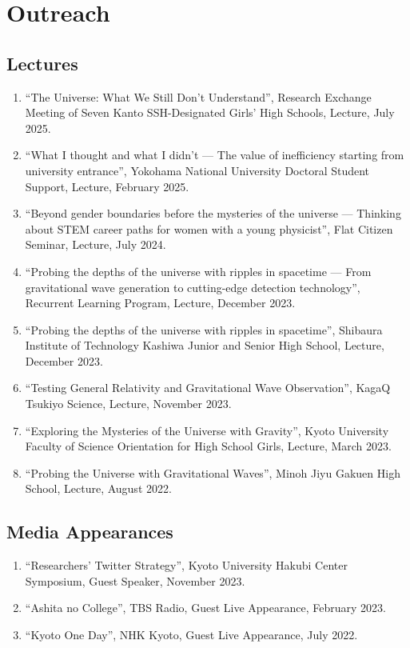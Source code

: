 \documentclass[uplatex, 12pt]{article}
\begin{document}

\section*{Outreach}
\subsection*{Lectures}
\begin{enumerate}
\item “The Universe: What We Still Don't Understand”, Research Exchange Meeting of Seven Kanto SSH-Designated Girls' High Schools, Lecture, July 2025.
\item “What I thought and what I didn’t — The value of inefficiency starting from university entrance”, Yokohama National University Doctoral Student Support, Lecture, February 2025.
\item “Beyond gender boundaries before the mysteries of the universe — Thinking about STEM career paths for women with a young physicist”, Flat Citizen Seminar, Lecture, July 2024.
\item “Probing the depths of the universe with ripples in spacetime — From gravitational wave generation to cutting-edge detection technology”, Recurrent Learning Program, Lecture, December 2023.
\item “Probing the depths of the universe with ripples in spacetime”, Shibaura Institute of Technology Kashiwa Junior and Senior High School, Lecture, December 2023.
\item “Testing General Relativity and Gravitational Wave Observation”, KagaQ Tsukiyo Science, Lecture, November 2023.
\item “Exploring the Mysteries of the Universe with Gravity”, Kyoto University Faculty of Science Orientation for High School Girls, Lecture, March 2023.
\item “Probing the Universe with Gravitational Waves”, Minoh Jiyu Gakuen High School, Lecture, August 2022.
\end{enumerate}
\subsection*{Media Appearances}
\begin{enumerate}
\item “Researchers’ Twitter Strategy”, Kyoto University Hakubi Center Symposium, Guest Speaker, November 2023.
\item “Ashita no College”, TBS Radio, Guest Live Appearance, February 2023.
\item “Kyoto One Day”, NHK Kyoto, Guest Live Appearance, July 2022.
\end{enumerate}
\end{document}
